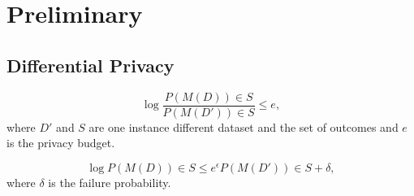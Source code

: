 \chapter{Preliminary}
\section{Differential Privacy}

\begin{equation}
	\log \frac{P(M(D))\in S}{P(M(D'))\in S} \leq e,
	\label{eq:privacy_loss}
\end{equation}
where $D'$ and $S$ are one instance different dataset and the set of outcomes and $e$ is the privacy budget.

\begin{equation}
	\log P(M(D))\in S \leq e^\epsilon P(M(D'))\in S + \delta, 
	\label{eq:eps_del_diff_privacy}
\end{equation}
where $\delta$ is the failure probability.

